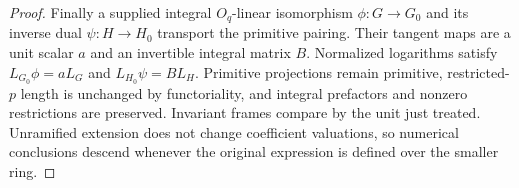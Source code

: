 \begin{proof}
Finally a supplied integral $O_q$-linear isomorphism $\phi:G\to G_0$ and its inverse dual $\psi:H\to H_0$ transport the primitive pairing. Their tangent maps are a unit scalar $a$ and an invertible integral matrix $B$. Normalized logarithms satisfy
$L_{G_0}\phi=aL_G$ and $L_{H_0}\psi=BL_H$.
Primitive projections remain primitive, restricted-$p$ length is unchanged by functoriality, and integral prefactors and nonzero restrictions are preserved. Invariant frames compare by the unit just treated. Unramified extension does not change coefficient valuations, so numerical conclusions descend whenever the original expression is defined over the smaller ring.
\end{proof}

